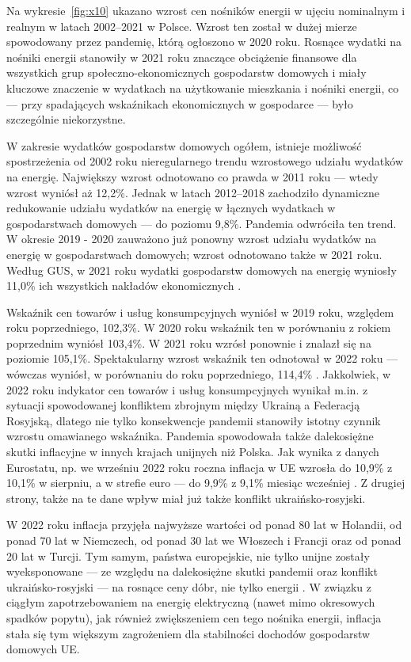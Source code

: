 \documentclass[polish, twoside, 12pt, a4paper]{article}
\theoremstyle{definition}
\theoremstyle{plain}
\theoremstyle{remark}
\begin{document}
Na wykresie~\ref{fig:x10} ukazano wzrost cen nośników energii w ujęciu nominalnym i realnym w latach 2002--2021 w Polsce. Wzrost ten został w dużej mierze spowodowany przez pandemię, którą ogłoszono w 2020 roku. Rosnące wydatki na nośniki energii stanowiły w 2021 roku znaczące obciążenie finansowe dla wszystkich grup społeczno-ekonomicznych gospodarstw domowych i miały kluczowe znaczenie w wydatkach na użytkowanie mieszkania i nośniki energii, co --- przy spadających wskaźnikach ekonomicznych w gospodarce --- było szczególnie niekorzystne. 

W zakresie wydatków gospodarstw domowych ogółem, istnieje możliwość spostrzeżenia od 2002 roku nieregularnego trendu wzrostowego udziału wydatków na energię. Największy wzrost odnotowano co prawda w 2011 roku --- wtedy wzrost wyniósł aż 12,2\%. Jednak w latach 2012--2018 zachodziło dynamiczne redukowanie udziału wydatków na energię w łącznych wydatkach w gospodarstwach domowych --- do poziomu 9,8\%. Pandemia odwróciła ten trend. W okresie 2019 - 2020 zauważono już ponowny wzrost udziału wydatków na energię w gospodarstwach domowych; wzrost odnotowano także w 2021 roku. Według GUS, w 2021 roku wydatki gospodarstw domowych na energię wyniosły 11,0\% ich wszystkich nakładów ekonomicznych \parencite{gus2023}. 

Wskaźnik cen towarów i usług konsumpcyjnych wyniósł w 2019 roku, względem roku poprzedniego, 102,3\%. W 2020 roku wskaźnik ten w porównaniu z rokiem poprzednim wyniósł 103,4\%. W 2021 roku wzrósł ponownie i znalazł się na poziomie 105,1\%. Spektakularny wzrost wskaźnik ten odnotował w 2022 roku --- wówczas wyniósł, w porównaniu do roku poprzedniego, 114,4\% \parencite{gus2023}. Jakkolwiek, w 2022 roku indykator cen towarów i usług konsumpcyjnych wynikał m.in. z sytuacji spowodowanej konfliktem zbrojnym między Ukrainą a Federacją Rosyjską, dlatego nie tylko konsekwencje pandemii stanowiły istotny czynnik wzrostu omawianego wskaźnika. Pandemia spowodowała także dalekosiężne skutki inflacyjne w innych krajach unijnych niż Polska. Jak wynika z danych Eurostatu, np. we wrześniu 2022 roku roczna inflacja w UE wzrosła do 10,9\% z 10,1\% w sierpniu, a w strefie euro --- do 9,9\% z 9,1\% miesiąc wcześniej \parencite{rp2022}. Z drugiej strony, także na te dane wpływ miał już także konflikt ukraińsko-rosyjski. 

W 2022 roku inflacja przyjęła najwyższe wartości od ponad 80 lat w Holandii, od ponad 70 lat w Niemczech, od ponad 30 lat we Włoszech i Francji oraz od ponad 20 lat w Turcji. Tym samym, państwa europejskie, nie tylko unijne zostały wyeksponowane --- ze względu na dalekosiężne skutki pandemii oraz konflikt ukraińsko-rosyjski --- na rosnące ceny dóbr, nie tylko energii \parencite{infor2022}. W związku z ciągłym zapotrzebowaniem na energię elektryczną (nawet mimo okresowych spadków popytu), jak również zwiększeniem cen tego nośnika energii, inflacja stała się tym większym zagrożeniem dla stabilności dochodów gospodarstw domowych UE. 
\end{document}
